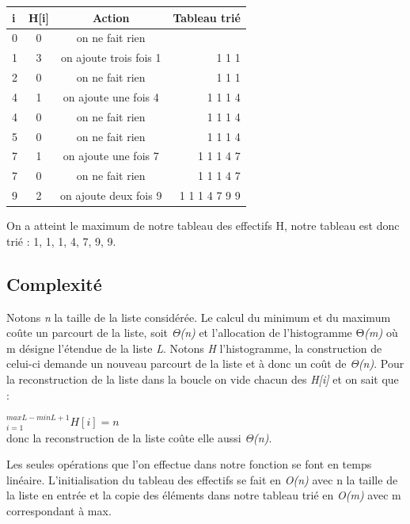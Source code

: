 \documentclass[12pt]{article}
\begin{document}
\vspace{0.5 cm}
\hspace{3.0 cm}
\begin{tabular}{|l|c|c|r|}
  \hline
  i & H[i]  & Action & Tableau trié \\
  \hline
  0 &	0 &	on ne fait rien &\\
  1 &	3 &	on ajoute trois fois 1 &	1 1 1\\
  2 &	0 &	on ne fait rien &	1 1 1\\
  4 &	1 &	on ajoute une fois 4&	1 1 1 4\\
  4 &	0& 	on ne fait rien &	1 1 1 4\\
5 &	0 &	on ne fait rien &	1 1 1 4\\
7 &	1 &	on ajoute une fois 7 &	1 1 1 4 7\\
7 &	0 &	on ne fait rien  &	1 1 1 4 7\\
9 &	2& 	on ajoute deux fois 9 &	1 1 1 4 7 9 9\\
  \hline
\end{tabular}


\vspace{1.0 cm}
On a atteint le maximum de notre tableau des effectifs H, notre tableau est donc trié : 1, 1, 1, 4, 7, 9, 9.




\newpage 
\subsection{Complexité}



\hspace{1.0 cm}  Notons \textit{n} la taille de la liste considérée. Le calcul du minimum et du maximum coûte un parcourt de la liste, soit \textit{Θ(n) }et l'allocation de l'histogramme Θ\textit{(m)} où m désigne l'étendue de la liste \textit{L}. Notons \textit{H} l'histogramme, la construction de celui-ci demande un nouveau parcourt de la liste et à donc un coût de \textit{Θ(n)}. Pour la reconstruction de la liste dans la boucle on vide chacun des \textit{H[i]} et on sait que : 


\hspace{6.0 cm}\large\sum\limits$_{i=1}^{maxL−minL+1}  H[i]=n $\\


\normalsize donc la reconstruction de la liste coûte elle aussi \textit{Θ(n)}.


\normalsize Les seules opérations que l'on effectue dans notre fonction se font en temps linéaire. L'initialisation du tableau des effectifs se fait en \textit{O(n)} avec n la taille de la liste en entrée et la copie des éléments dans notre tableau trié en \textit{O(m)} avec m correspondant à max.
\end{document}
